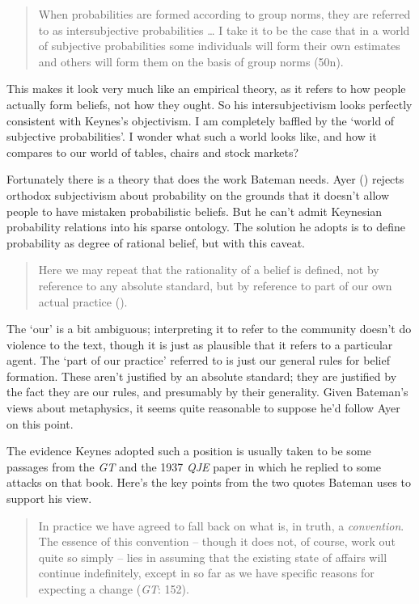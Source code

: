 \documentclass[
  10pt,
  letterpaper,
  DIV=11,
  numbers=noendperiod,
  twoside]{scrartcl}
\begin{document}
\begin{quote}
When probabilities are formed according to group norms, they are
referred to as intersubjective probabilities \ldots{} I take it to be
the case that in a world of subjective probabilities some individuals
will form their own estimates and others will form them on the basis of
group norms (50n).
\end{quote}

This makes it look very much like an empirical theory, as it refers to
how people actually form beliefs, not how they ought. So his
intersubjectivism looks perfectly consistent with Keynes's objectivism.
I am completely baffled by the `world of subjective probabilities'. I
wonder what such a world looks like, and how it compares to our world of
tables, chairs and stock markets?

Fortunately there is a theory that does the work Bateman needs. Ayer
() rejects orthodox subjectivism about
probability on the grounds that it doesn't allow people to have mistaken
probabilistic beliefs. But he can't admit Keynesian probability
relations into his sparse ontology. The solution he adopts is to define
probability as degree of rational belief, but with this caveat.

\begin{quote}
Here we may repeat that the rationality of a belief is defined, not by
reference to any absolute standard, but by reference to part of our own
actual practice ().
\end{quote}

The `our' is a bit ambiguous; interpreting it to refer to the community
doesn't do violence to the text, though it is just as plausible that it
refers to a particular agent. The `part of our practice' referred to is
just our general rules for belief formation. These aren't justified by
an absolute standard; they are justified by the fact they are our rules,
and presumably by their generality. Given Bateman's views about
metaphysics, it seems quite reasonable to suppose he'd follow Ayer on
this point.

The evidence Keynes adopted such a position is usually taken to be some
passages from the \emph{GT} and the 1937 \emph{QJE} paper in which he
replied to some attacks on that book. Here's the key points from the two
quotes Bateman uses to support his view.

\begin{quote}
In practice we have agreed to fall back on what is, in truth, a
\emph{convention}. The essence of this convention -- though it does not,
of course, work out quite so simply -- lies in assuming that the
existing state of affairs will continue indefinitely, except in so far
as we have specific reasons for expecting a change (\emph{GT}: 152).
\end{quote}
\end{document}
